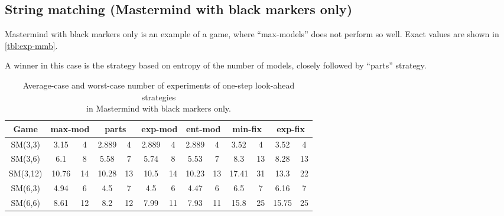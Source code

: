 \subsection{String matching (Mastermind with black markers only)}

Mastermind with black markers only is an example of a game,
  where ``max-models'' does not perform so well.
Exact values are shown in \autoref{tbl:exp-mmb}.

A winner in this case is the strategy based on entropy of the number of models,
  closely followed by ``parts'' strategy.

\begin{table}[h]
\begin{center}
\begin{tabular}{|c|c|c|c|c|c|c|c|c|c|c|c|c|}\hline
Game & \multicolumn{2}{c}{max-mod} & \multicolumn{2}{c}{parts}
& \multicolumn{2}{c}{exp-mod} & \multicolumn{2}{c}{ent-mod}
& \multicolumn{2}{c}{min-fix} & \multicolumn{2}{c}{exp-fix}\\ \hline
SM(3,3) & 3.15 &  4 &  2.889 & 4 & 2.889 & 4 & 2.889 & 4 & 3.52 &  4 & 3.52 &  4 \\
SM(3,6) & 6.1 & 8 &  5.58 &  7 & 5.74 &  8 & 5.53 &  7 & 8.3 & 13 &  8.28 &  13 \\
SM(3,12) &  10.76 & 14 &   10.28 & 13 &  10.5 &  14 &  10.23 & 13 &  17.41 & 31 &  13.3 &  22 \\ \hline
SM(6,3) & 4.94 &  6 &  4.5 & 7 & 4.5 & 6 & 4.47 &  6 & 6.5 & 7 & 6.16 &  7 \\
SM(6,6) & 8.61 &  12 &   8.2 & 12 &  7.99 &  11 &  7.93 &  11 &  15.8 &  25 &  15.75 & 25 \\ \hline
\end{tabular}
\caption{Average-case and worst-case number of experiments
  of one-step look-ahead strategies \\ in Mastermind with black markers only.}
\label{tbl:exp-mmb}
\end{center}
\end{table}

